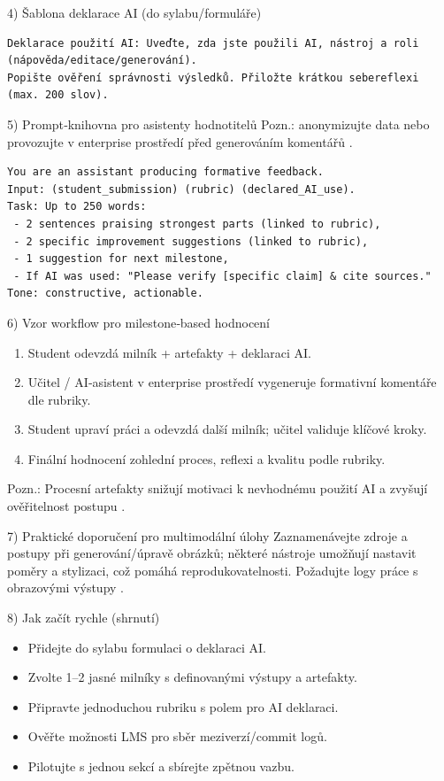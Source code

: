 \documentclass{report}%
\begin{document}
4) Šablona deklarace AI (do sylabu/formuláře)
\begin{verbatim}
Deklarace použití AI: Uveďte, zda jste použili AI, nástroj a roli (nápověda/editace/generování).
Popište ověření správnosti výsledků. Přiložte krátkou sebereflexi (max. 200 slov).
\end{verbatim}

5) Prompt‑knihovna pro asistenty hodnotitelů
Pozn.: anonymizujte data nebo provozujte v enterprise prostředí před generováním komentářů \cite{kb_ai_101_tipu_pdf_04e4a115_page_15_2}.
\begin{verbatim}
You are an assistant producing formative feedback.
Input: (student_submission) (rubric) (declared_AI_use).
Task: Up to 250 words:
 - 2 sentences praising strongest parts (linked to rubric),
 - 2 specific improvement suggestions (linked to rubric),
 - 1 suggestion for next milestone,
 - If AI was used: "Please verify [specific claim] & cite sources."
Tone: constructive, actionable.
\end{verbatim}

6) Vzor workflow pro milestone‑based hodnocení
\begin{enumerate}
  \item Student odevzdá milník + artefakty + deklaraci AI.
  \item Učitel / AI‑asistent v enterprise prostředí vygeneruje formativní komentáře dle rubriky.
  \item Student upraví práci a odevzdá další milník; učitel validuje klíčové kroky.
  \item Finální hodnocení zohlední proces, reflexi a kvalitu podle rubriky.
\end{enumerate}
Pozn.: Procesní artefakty snižují motivaci k nevhodnému použití AI a zvyšují ověřitelnost postupu \cite{kb_ai_101_tipu_pdf_04e4a115_page_8_1}.

7) Praktické doporučení pro multimodální úlohy
Zaznamenávejte zdroje a postupy při generování/úpravě obrázků; některé nástroje umožňují nastavit poměry a stylizaci, což pomáhá reprodukovatelnosti. Požadujte logy práce s obrazovými výstupy \cite{kb_ai_101_tipu_pdf_04e4a115_page_51_1}.

8) Jak začít rychle (shrnutí)
\begin{itemize}
  \item Přidejte do sylabu formulaci o deklaraci AI.
  \item Zvolte 1–2 jasné milníky s definovanými výstupy a artefakty.
  \item Připravte jednoduchou rubriku s polem pro AI deklaraci.
  \item Ověřte možnosti LMS pro sběr meziverzí/commit logů.
  \item Pilotujte s jednou sekcí a sbírejte zpětnou vazbu.
\end{itemize}
\end{document}

